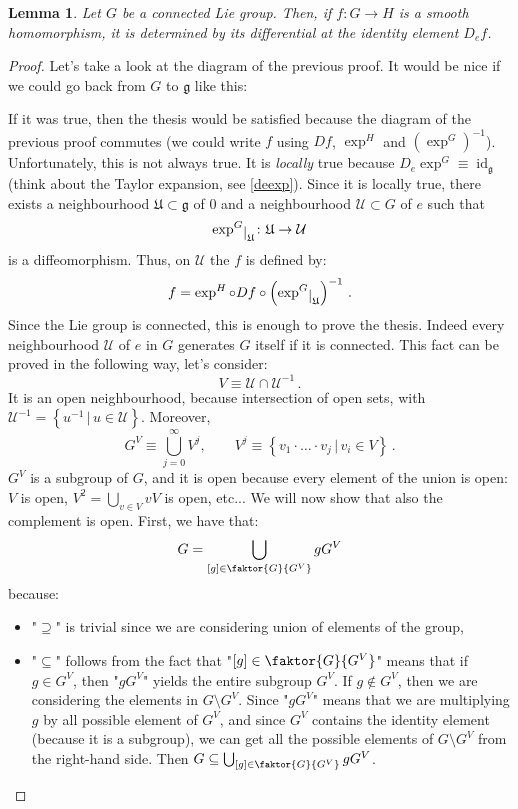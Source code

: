 \documentclass[a4paper,11pt,titlepage, article, oneside]{memoir}
\numberwithin{equation}{section}
\newtheorem{lemma}[theorem]{Lemma}
\theoremstyle{definition}
\theoremstyle{remark}
\DeclareMathOperator{\id}{id}
\newcommand{\lie}[1]{\mathfrak{#1}}
\newcommand{\restrict}[2]{{#1}\raisebox{-.5ex}{$|$}_{#2}}
\begin{document}
\begin{lemma} \label{connliegroup}
Let $G$ be a connected Lie group. Then, if $f \colon G \rightarrow H$ is a smooth homomorphism, it is determined by its differential at the identity element $D_e f$.
\end{lemma}
\begin{proof}
Let's take a look at the diagram of the previous proof. It would be nice if we could go back from $G$ to $\lie{g}$ like this:
\begin{center}
\end{center}
If it was true, then the thesis would be satisfied because the diagram of the previous proof commutes (we could write $f$ using $Df$, $\exp^H$ and $(\exp^G)^{-1}$). Unfortunately, this is not always true. It is \textit{locally} true because $D_e \exp^G \equiv \id_{\lie{g}}$ (think about the Taylor expansion, see \eqref{deexp}). Since it is locally true, there exists a neighbourhood $\mathfrak{U} \subset \lie{g}$ of 0 and a neighbourhood $\mathcal{U} \subset G$ of $e$ such that
$$\restrict{\exp^G}{\mathfrak{U}} \colon \mathfrak{U} \rightarrow \mathcal{U}$$
is a diffeomorphism. Thus, on $\mathcal{U}$ the $f$ is defined by:
$$f = \exp^H \circ Df \circ \left(\restrict{\exp^G}{\mathfrak{U}}\right)^{-1} \, .$$
Since the Lie group is connected, this is enough to prove the thesis. Indeed every neighbourhood $\mathcal{U}$ of $e$ in $G$ generates $G$ itself if it is connected. This fact can be proved in the following way, let's consider:
$$V \equiv \mathcal{U} \cap \mathcal{U}^{-1} \, .$$
It is an open neighbourhood, because intersection of open sets, with
$\mathcal{U}^{-1} = \left \{u^{-1} \, | \, u \in \mathcal{U} \right \}$. Moreover,
$$G^V \equiv \bigcup_{j=0}^{\infty} V^j, \qquad V^j \equiv \left \{v_1 \cdot \ldots \cdot v_j \, | \, v_i \in V \right \} \, .$$
$G^V$ is a subgroup of $G$, and it is open because every element of the union is open: $V$ is open, $V^2 = \bigcup_{v \in V} v V$ is open, etc... We will now show that also the complement is open. First, we have that:
$$G = \bigcup_{[g] \in \faktor{G}{G^V}} g G^V$$
because:
\begin{itemize}
\item "$\supseteq$" is trivial since we are considering union of elements of the group,
\item "$\subseteq$" follows from the fact that "$[g] \in \faktor{G}{G^V}$" means that if $g \in G^V$, then "$gG^V$" yields the entire subgroup $G^V$. If $g \not \in G^V$, then we are considering the elements in $G \setminus G^V$. Since "$g G^V$" means that we are multiplying $g$ by all possible element of $G^V$, and since $G^V$ contains the identity element (because it is a subgroup), we can get all the possible elements of $G \setminus G^V$ from the right-hand side. Then $G \subseteq \bigcup_{[g] \in \faktor{G}{G^V}} g G^V$.

\end{itemize}
\end{proof}
\end{document}
